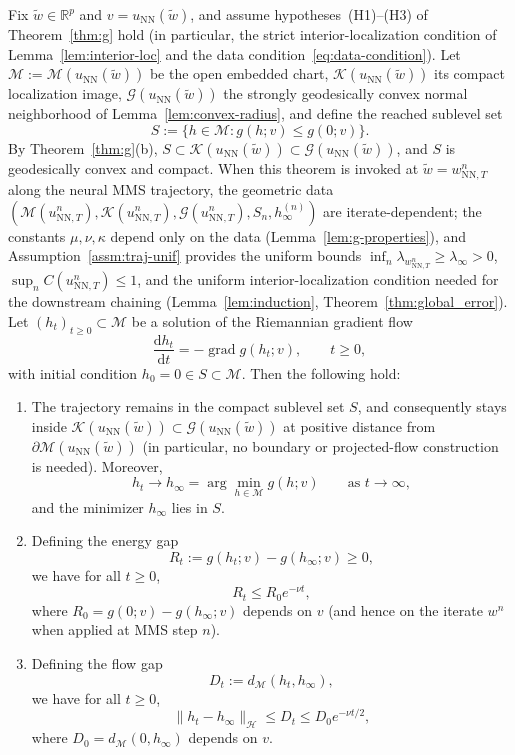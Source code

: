 \documentclass[twoside,11pt]{article}
\newcommand{\R}{\mathbb{R}}
\newcommand{\ud}{\mathrm{d}}
\newcommand{\grad}{\operatorname{grad} }
\newcommand{\NN}{\mathrm{NN}}
\newcommand{\calG}{\mathcal{G}}
\newcommand{\calK}{\mathcal{K}}
\newcommand{\calM}{\mathcal{M}}
\begin{document}
\begin{theorem}\label{thm:RGF-conv}
Fix $\tilde w\in\R^p$ and $v=u_\NN(\tilde w)$, and assume hypotheses~(H1)--(H3) of Theorem~\ref{thm:g} hold (in particular, the strict interior-localization condition of Lemma~\ref{lem:interior-loc} and the data condition~\eqref{eq:data-condition}). Let $\mathcal M:=\mathcal{M}(u_\NN(\tilde w))$ be the open embedded chart, $\calK(u_\NN(\tilde w))$ its compact localization image, $\calG(u_\NN(\tilde w))$ the strongly geodesically convex normal neighborhood of Lemma~\ref{lem:convex-radius}, and define the reached sublevel set
\[
S:=\{h\in \mathcal M:  g(h;v)\le g(0;v)\}.
\]
By Theorem~\ref{thm:g}(b), $S \subset \calK(u_\NN(\tilde w)) \subset \calG(u_\NN(\tilde w))$, and $S$ is geodesically convex and compact. When this theorem is invoked at $\tilde w=w^n_{\NN,T}$ along the neural MMS trajectory, the geometric data $(\calM(u^n_{\NN,T}), \calK(u^n_{\NN,T}), \calG(u^n_{\NN,T}), S_n, h_\infty^{(n)})$ are iterate-dependent; the constants $\mu,\nu,\kappa$ depend only on the data (Lemma~\ref{lem:g-properties}), and Assumption~\ref{assm:traj-unif} provides the uniform bounds $\inf_n\lambda_{w^n_{\NN,T}}\ge\lambda_\infty>0$, $\sup_n C(u^n_{\NN,T})\le 1$, and the uniform interior-localization condition needed for the downstream chaining (Lemma~\ref{lem:induction}, Theorem~\ref{thm:global_error}).
Let $(h_t)_{t\ge 0}\subset \mathcal M$ be a solution of the Riemannian gradient flow
\begin{equation*}
\frac{\ud h_t}{\ud t}  =  -\grad g(h_t;v),\qquad t\ge 0,
\end{equation*}
with initial condition $h_0=0\in S \subset \mathcal M$. Then the following hold:

\begin{enumerate}
\item[(a)] The trajectory remains in the compact sublevel set $S$, and consequently stays inside $\calK(u_\NN(\tilde w)) \subset \calG(u_\NN(\tilde w))$ at positive distance from $\partial\calM(u_\NN(\tilde w))$ (in particular, no boundary or projected-flow construction is needed). Moreover,
\[
h_t  \to  h_\infty
 = \arg\min_{h\in\mathcal M} g(h;v)
\qquad\text{as }t\to\infty,
\]
and the minimizer $h_\infty$ lies in $S$.

\item[(b)]
Defining the energy gap
\[
R_t:=g(h_t;v)-g(h_\infty;v)\ge 0,
\]
we have for all $t\ge 0$,
\[
R_t \le R_0 e^{-\nu t},
\]
where $R_0=g(0;v)-g(h_\infty;v)$ depends on $v$ (and hence on the iterate $w^n$ when applied at MMS step $n$).

\item[(c)]
Defining the flow gap
\[
D_t:=d_{\mathcal M}(h_t,h_\infty),
\]
we have for all $t\ge 0$,
\[
\|h_t-h_\infty\|_{\mathcal H}  \le  D_t \le D_0 e^{-\nu t/2},
\]
where $D_0=d_{\mathcal M}(0,h_\infty)$ depends on $v$.
\end{enumerate}
\end{theorem}
\end{document}
